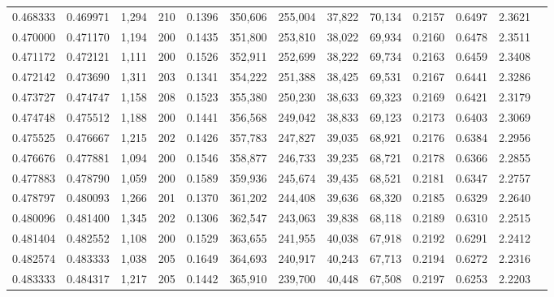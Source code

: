 \begin{tabular}{rrrrrrrrrrrrr}
0.468333 & 0.469971 &  1,294 &   210 &                                     0.1396 & 350,606 & 255,004 &  37,822 &  70,134 & 0.2157 & 0.6497 & 2.3621 \\
0.470000 & 0.471170 &  1,194 &   200 &                                     0.1435 & 351,800 & 253,810 &  38,022 &  69,934 & 0.2160 & 0.6478 & 2.3511 \\
0.471172 & 0.472121 &  1,111 &   200 &                                     0.1526 & 352,911 & 252,699 &  38,222 &  69,734 & 0.2163 & 0.6459 & 2.3408 \\
0.472142 & 0.473690 &  1,311 &   203 &                                     0.1341 & 354,222 & 251,388 &  38,425 &  69,531 & 0.2167 & 0.6441 & 2.3286 \\
0.473727 & 0.474747 &  1,158 &   208 &                                     0.1523 & 355,380 & 250,230 &  38,633 &  69,323 & 0.2169 & 0.6421 & 2.3179 \\
0.474748 & 0.475512 &  1,188 &   200 &                                     0.1441 & 356,568 & 249,042 &  38,833 &  69,123 & 0.2173 & 0.6403 & 2.3069 \\
0.475525 & 0.476667 &  1,215 &   202 &                                     0.1426 & 357,783 & 247,827 &  39,035 &  68,921 & 0.2176 & 0.6384 & 2.2956 \\
0.476676 & 0.477881 &  1,094 &   200 &                                     0.1546 & 358,877 & 246,733 &  39,235 &  68,721 & 0.2178 & 0.6366 & 2.2855 \\
0.477883 & 0.478790 &  1,059 &   200 &                                     0.1589 & 359,936 & 245,674 &  39,435 &  68,521 & 0.2181 & 0.6347 & 2.2757 \\
0.478797 & 0.480093 &  1,266 &   201 &                                     0.1370 & 361,202 & 244,408 &  39,636 &  68,320 & 0.2185 & 0.6329 & 2.2640 \\
0.480096 & 0.481400 &  1,345 &   202 &                                     0.1306 & 362,547 & 243,063 &  39,838 &  68,118 & 0.2189 & 0.6310 & 2.2515 \\
0.481404 & 0.482552 &  1,108 &   200 &                                     0.1529 & 363,655 & 241,955 &  40,038 &  67,918 & 0.2192 & 0.6291 & 2.2412 \\
0.482574 & 0.483333 &  1,038 &   205 &                                     0.1649 & 364,693 & 240,917 &  40,243 &  67,713 & 0.2194 & 0.6272 & 2.2316 \\
0.483333 & 0.484317 &  1,217 &   205 &                                     0.1442 & 365,910 & 239,700 &  40,448 &  67,508 & 0.2197 & 0.6253 & 2.2203 \\

\end{tabular}
